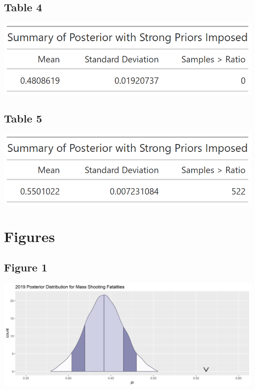 \documentclass{article}
\begin{document}
\subsection{Table 4}
\includegraphics[scale=.5]{Table4.png}\label{Table 4}

\subsection{Table 5}
\includegraphics[scale=.5]{Table5.png}\label{Table 5}

\section{Figures}
\subsection{Figure 1}
\includegraphics[scale=.5]{Figure1.png}\label{Figure 1}
\end{document}
